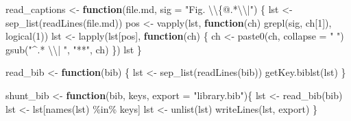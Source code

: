\documentclass[
]{article}
\newenvironment{Shaded}{\begin{snugshade}}{\end{snugshade}}
\newcommand{\AttributeTok}[1]{\textcolor[rgb]{0.77,0.63,0.00}{#1}}
\newcommand{\ControlFlowTok}[1]{\textcolor[rgb]{0.13,0.29,0.53}{\textbf{#1}}}
\newcommand{\DecValTok}[1]{\textcolor[rgb]{0.00,0.00,0.81}{#1}}
\newcommand{\FunctionTok}[1]{\textcolor[rgb]{0.00,0.00,0.00}{#1}}
\newcommand{\NormalTok}[1]{#1}
\newcommand{\OtherTok}[1]{\textcolor[rgb]{0.56,0.35,0.01}{#1}}
\newcommand{\SpecialCharTok}[1]{\textcolor[rgb]{0.00,0.00,0.00}{#1}}
\newcommand{\StringTok}[1]{\textcolor[rgb]{0.31,0.60,0.02}{#1}}
\begin{document}
\begin{Shaded}
\begin{Highlighting}[]
\NormalTok{read\_captions }\OtherTok{\textless{}{-}} \ControlFlowTok{function}\NormalTok{(file.md, }\AttributeTok{sig =} \StringTok{"Fig. }\SpecialCharTok{\textbackslash{}\textbackslash{}}\StringTok{\{@.*}\SpecialCharTok{\textbackslash{}\textbackslash{}}\StringTok{|"}\NormalTok{)}
\NormalTok{\{}
\NormalTok{  lst }\OtherTok{\textless{}{-}} \FunctionTok{sep\_list}\NormalTok{(}\FunctionTok{readLines}\NormalTok{(file.md))}
\NormalTok{  pos }\OtherTok{\textless{}{-}} \FunctionTok{vapply}\NormalTok{(lst, }\ControlFlowTok{function}\NormalTok{(ch) }\FunctionTok{grepl}\NormalTok{(sig, ch[}\DecValTok{1}\NormalTok{]), }\FunctionTok{logical}\NormalTok{(}\DecValTok{1}\NormalTok{))}
\NormalTok{  lst }\OtherTok{\textless{}{-}} \FunctionTok{lapply}\NormalTok{(lst[pos],}
    \ControlFlowTok{function}\NormalTok{(ch) \{}
\NormalTok{      ch }\OtherTok{\textless{}{-}} \FunctionTok{paste0}\NormalTok{(ch, }\AttributeTok{collapse =} \StringTok{" "}\NormalTok{)}
      \FunctionTok{gsub}\NormalTok{(}\StringTok{"\^{}.* }\SpecialCharTok{\textbackslash{}\textbackslash{}}\StringTok{| "}\NormalTok{, }\StringTok{"**"}\NormalTok{, ch)}
\NormalTok{    \})}
\NormalTok{  lst}
\NormalTok{\}}

\NormalTok{read\_bib }\OtherTok{\textless{}{-}} \ControlFlowTok{function}\NormalTok{(bib) \{}
\NormalTok{  lst }\OtherTok{\textless{}{-}} \FunctionTok{sep\_list}\NormalTok{(}\FunctionTok{readLines}\NormalTok{(bib))}
  \FunctionTok{getKey.biblst}\NormalTok{(lst)}
\NormalTok{\}}

\NormalTok{shunt\_bib }\OtherTok{\textless{}{-}} \ControlFlowTok{function}\NormalTok{(bib, keys, }\AttributeTok{export =} \StringTok{"library.bib"}\NormalTok{)\{}
\NormalTok{  lst }\OtherTok{\textless{}{-}} \FunctionTok{read\_bib}\NormalTok{(bib)}
\NormalTok{  lst }\OtherTok{\textless{}{-}}\NormalTok{ lst[}\FunctionTok{names}\NormalTok{(lst) }\SpecialCharTok{\%in\%}\NormalTok{ keys]}
\NormalTok{  lst }\OtherTok{\textless{}{-}} \FunctionTok{unlist}\NormalTok{(lst)}
  \FunctionTok{writeLines}\NormalTok{(lst, export)}
\NormalTok{\}}


\end{Highlighting}
\end{Shaded}
\end{document}
